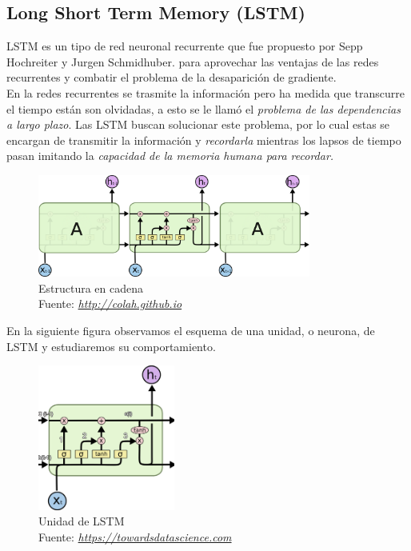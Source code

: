 \subsection{Long Short Term Memory (LSTM)}\label{lstmlabel}

LSTM es un tipo de red neuronal recurrente que fue propuesto por Sepp Hochreiter y Jurgen Schmidhuber.\cite{LSTM} para aprovechar las ventajas de las redes recurrentes y combatir el problema de la desaparición de gradiente.\\ En la redes recurrentes se trasmite la información pero ha medida que transcurre el tiempo están son olvidadas, a esto se le llamó el \textit{problema de las dependencias a largo plazo}. Las LSTM buscan solucionar este problema, por lo cual estas se encargan de transmitir la información y \textit{recordarla} mientras los lapsos de tiempo pasan imitando la \textit{capacidad de la memoria humana para recordar.}


\begin{figure}[H]
	\centering
	\includegraphics[width=0.8\textwidth]{Figures/LSTM-chain.png}
	\caption{Estructura en cadena \\ Fuente:  \href{http://colah.github.io/posts/2015-08-Understanding-LSTMs/}{\textit{http://colah.github.io}}}
	\label{}
\end{figure}

En la siguiente figura observamos el esquema de una unidad, o neurona, de LSTM y estudiaremos su comportamiento.
\begin{figure}[H]
	\centering
	\includegraphics[width=0.4\textwidth]{Figures/LSTM.png}
	\caption{Unidad de LSTM \\ Fuente:  \href{https://towardsdatascience.com/understanding-lstm-and-its-quick-implementation-in-keras-for-sentiment-analysis-af410fd85b47g}{\textit{https://towardsdatascience.com}}}
	\label{}
\end{figure}


